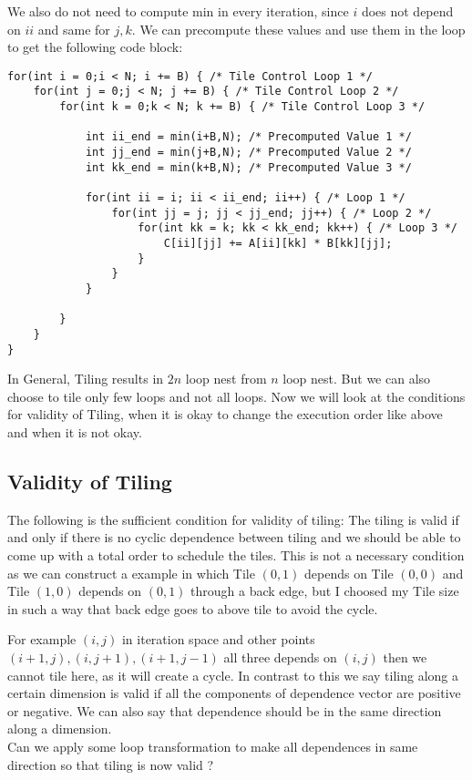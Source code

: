 \documentclass{article}
\begin{document}
We also do not need to compute min in every iteration, since $i$ does not depend on $ii$ and same for $j,k$. We can precompute these values and use them in the loop to get the following code block:

\begin{lstlisting}
for(int i = 0;i < N; i += B) { /* Tile Control Loop 1 */
    for(int j = 0;j < N; j += B) { /* Tile Control Loop 2 */
        for(int k = 0;k < N; k += B) { /* Tile Control Loop 3 */
            
            int ii_end = min(i+B,N); /* Precomputed Value 1 */
            int jj_end = min(j+B,N); /* Precomputed Value 2 */
            int kk_end = min(k+B,N); /* Precomputed Value 3 */

            for(int ii = i; ii < ii_end; ii++) { /* Loop 1 */
                for(int jj = j; jj < jj_end; jj++) { /* Loop 2 */
                    for(int kk = k; kk < kk_end; kk++) { /* Loop 3 */
                        C[ii][jj] += A[ii][kk] * B[kk][jj];
                    }
                }
            }

        }
    }
}
\end{lstlisting}
In General, Tiling results in $2n$ loop nest from $n$ loop nest. But we can also choose to tile only few loops and not all loops. Now we will look at the conditions for validity of Tiling, when it is okay to change the execution order like above and when it is not okay. \\

\subsection*{Validity of Tiling}
The following is the sufficient condition for validity of tiling: The tiling is valid if and only if there is no cyclic dependence between tiling and we should be able to come up with a total order to schedule the tiles. This is not a necessary condition as we can construct a example in which Tile $(0,1)$ depends on Tile $(0,0)$ and Tile $(1,0)$ depends on $(0,1)$ through a back edge, but I choosed my Tile size in such a way that back edge goes to above tile to avoid the cycle.

\bigskip

For example $(i,j)$ in iteration space and other points $(i+1,j),(i,j+1),(i+1,j-1)$ all three depends on $(i,j)$ then we cannot tile here, as it will create a cycle. In contrast to this we say tiling along a certain dimension is valid if all the components of dependence vector are positive or negative. We can also say that dependence should be in the same direction along a dimension. \\
Can we apply some loop transformation to make all dependences in same direction so that tiling is now valid ? \\
\end{document}
